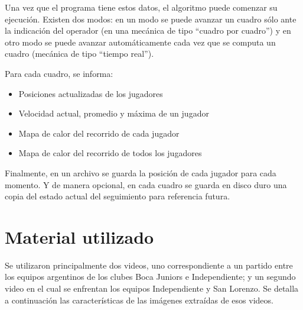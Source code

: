 Una vez que el programa tiene estos datos, el algoritmo puede comenzar su
ejecución. Existen dos modos: en un modo se puede avanzar un cuadro sólo ante la
indicación del operador (en una mecánica de tipo ``cuadro por cuadro'') y en
otro modo se puede avanzar automáticamente cada vez que se computa un cuadro
(mecánica de tipo ``tiempo real'').

Para cada cuadro, se informa:
\begin{itemize}
\item Posiciones actualizadas de los jugadores
\item Velocidad actual, promedio y máxima de un jugador
\item Mapa de calor del recorrido de cada jugador
\item Mapa de calor del recorrido de todos los jugadores
\end{itemize}

Finalmente, en un archivo se guarda la posición de cada jugador para cada momento.
Y de manera opcional, en cada cuadro se guarda en disco duro una copia del estado
actual del seguimiento para referencia futura.


\section{Material utilizado}

Se utilizaron principalmente dos videos, uno correspondiente a un partido entre
los equipos argentinos de los clubes Boca Juniors e Independiente; y un segundo
video en el cual se enfrentan los equipos Independiente y San Lorenzo. Se
detalla a continuación las características de las imágenes extraídas de esos
videos.

